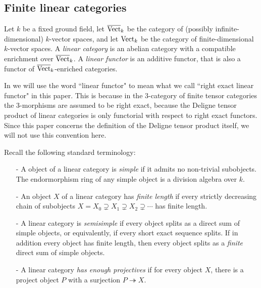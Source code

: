 \documentclass{amsart}
\begin{document}
\subsection{Finite linear categories}

	Let $k$ be a fixed ground field, let $\overline{\mathrm{Vect}}_k$ be the category of (possibly infinite-dimensional) $k$-vector spaces, and let $\mathrm{Vect}_k$ be the category of finite-dimensional $k$-vector spaces.   A {\em linear category} is an abelian category with a compatible enrichment over $\overline{\mathrm{Vect}}_k$.   
A {\em linear functor} is an additive functor, that is also a functor of $\overline{\mathrm{Vect}}_k$-enriched categories. 

\begin{warning}
	In \cite{3TC, DTCI} we will use the word ``linear functor" to mean what we call ``right exact linear functor" in this paper.  This is because in the $3$-category of finite tensor categories the $3$-morphisms are assumed to be right exact, because the Deligne tensor product of linear categories is only functorial with respect to right exact functors.  Since this paper concerns the definition of the Deligne tensor product itself, we will not use this convention here.
\end{warning}

Recall the following standard terminology:
\begin{itemize}
	\item[-] A object of a linear category is {\em simple} if it admits no non-trivial subobjects. The endormorphism ring of any simple object is a division algebra over $k$. 
	\item[-] An object $X$ of a linear category has {\em finite length} if every strictly decreasing chain of subobjects $X = X_0 \supsetneq X_1 \supsetneq X_2 \supsetneq  \cdots$ has finite length. 
	\item[-] A linear category is {\em semisimple} if every object splits as a direct sum of simple objects, or equivalently, if every short exact sequence splits. If in addition every object has finite length, then every object splits as a {\em finite} direct sum of simple objects.
	\item[-] A linear category {\em has enough projectives} if for every object $X$, there is a project object $P$ with a surjection $P \twoheadrightarrow X$. 
\end{itemize}
\end{document}
